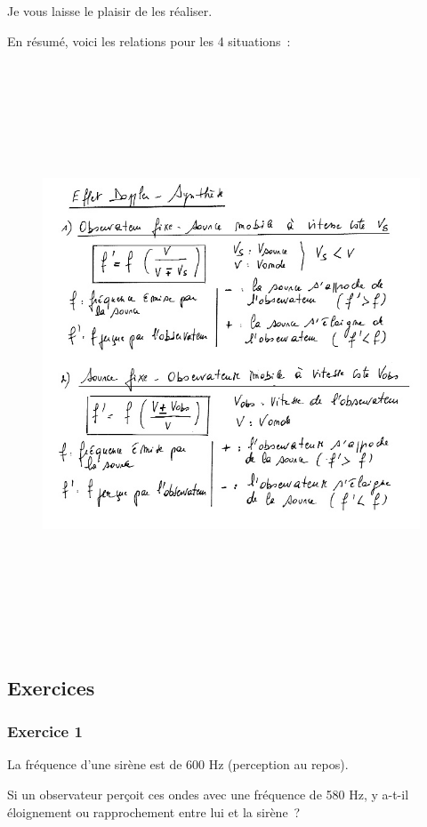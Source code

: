 Je vous laisse le plaisir de les réaliser.

En résumé, voici les relations pour les 4 situations~:
\begin{figure}
\centering
\includegraphics[width=17.866cm,height=17.32cm]{Pictures/100000010000025C00000234BE3EA55298C88B1D.png}
\caption{}
\end{figure}

\subsection{Exercices}

\subsubsection{Exercice 1}%

La fréquence d'une sirène est de 600 Hz (perception au repos).

Si un observateur perçoit ces ondes avec une fréquence de 580 Hz, y
a-t-il éloignement ou rapprochement entre lui et la sirène~?

